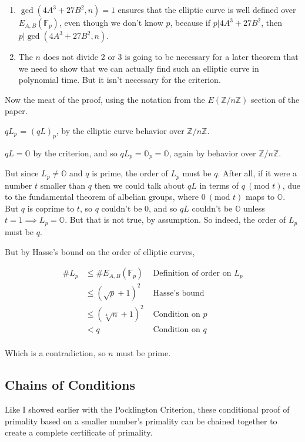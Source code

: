 \documentclass[]{article}
\newcommand{\Z}{\mathbb{Z}}
\newcommand{\OS}{\mathbb{O}}
\newcommand{\ZMZ}[1]{\Z/#1\Z}
\newcommand{\F}{\mathbb{F}}
\newcommand{\Mod}[1]{\ (\text{mod }#1)}
\begin{document}
\begin{enumerate}
	\item   $\gcd(4A^3+27B^2,n) = 1$ ensures that the elliptic curve is well defined over $E_{A,B}(\F_p)$, even though we don't know $p$, because if $p | 4A^3+27B^2$, then $p | \gcd(4A^3+27B^2,n)$.
	\item The $n$ does not divide 2 or 3 is going to be necessary for a later theorem that we need to show that we can actually find such an elliptic curve in polynomial time. But it isn't necessary for the criterion.
\end{enumerate}

\noindent Now the meat of the proof, using the notation from the $E(\ZMZ{n})$ section of the paper.

\noindent $qL_p$ = $(qL)_p$, by the elliptic curve behavior over $\ZMZ{n}$.

\noindent $qL = \OS$ by the criterion, and so $qL_p = \OS_p = \OS$, again by behavior over $\ZMZ{n}$.

\noindent  But since $L_p \ne \OS$ and $q$ is prime, the order of $L_p$ must be $q$. After all, if it were a number $t$ smaller than $q$ then we could talk about $qL$ in terms of $q \Mod{t}$, due to the fundamental theorem of albelian groups, where $0 \Mod{t}$ maps to $\OS$. But $q$ is coprime to $t$, so $q$ couldn't be 0, and so $qL$ couldn't be $\OS$ unless $t=1 \implies L_p = \OS$. But that is not true, by assumption. So indeed, the order of $L_p$ must be $q$. %

\noindent But by Hasse's bound on the order of elliptic curves,

$$\begin{aligned}\# L_p &\le \# E_{A,B}(\F_p) & \text{ Definition of order on } L_p\\
 &\le (\sqrt{p}+1)^2  & \text{  Hasse's bound}\\
 &\le (\sqrt[4]{n}+1)^2 & \text{ Condition on } p\\
 &< q & \text{ Condition on } q\\
 \end{aligned}$$

\noindent  Which is a contradiction, so $n$ must be prime.

\subsection{Chains of Conditions}

Like I showed earlier with the Pocklington Criterion, these conditional proof of primality based on a smaller number's primality can be chained together to create a complete certificate of primality.
\end{document}
